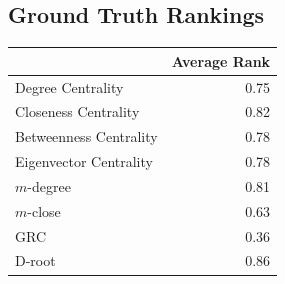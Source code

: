 \documentclass[3p,times]{elsarticle}
\begin{document}

\subsection{Ground Truth Rankings}
\begin{table}[ht]
\centering
\begin{tabular}{lr}
  \hline
 & Average Rank \\ 
  \hline
Degree Centrality & 0.75 \\ 
  Closeness Centrality & 0.82 \\ 
  Betweenness Centrality & 0.78 \\ 
  Eigenvector Centrality & 0.78 \\ 
  $m$-degree & 0.81 \\ 
  $m$-close & 0.63 \\ 
  GRC & 0.36 \\ 
  D-root & 0.86 \\ 
   \hline
\end{tabular}
\end{table}

%
\end{document}
